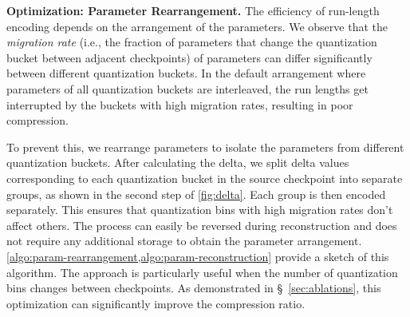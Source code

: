 \noindent\textbf{Optimization: Parameter Rearrangement.}
\label{sec:param-rearrangement}
The efficiency of run-length encoding depends on the arrangement of the parameters. We observe that the \emph{migration rate} (i.e., the fraction of parameters that change the quantization bucket between adjacent checkpoints) of parameters can differ significantly between different quantization buckets. In the default arrangement where parameters of all quantization buckets are interleaved, the run lengths get interrupted by the buckets with high migration rates, resulting in poor compression.

To prevent this, we rearrange parameters to isolate the parameters from different quantization buckets. After calculating the delta, we split delta values corresponding to each quantization bucket in the source checkpoint into separate groups, as shown in the second step of \cref{fig:delta}. Each group is then encoded separately. This ensures that quantization bins with high migration rates don't affect others. The process can easily be reversed during reconstruction and does not require any additional storage to obtain the parameter arrangement. \cref{algo:param-rearrangement,algo:param-reconstruction} provide a sketch of this algorithm. The approach is particularly useful when the number of quantization bins changes between checkpoints. As demonstrated in \S~\ref{sec:ablations}, this optimization can significantly improve the compression ratio.




